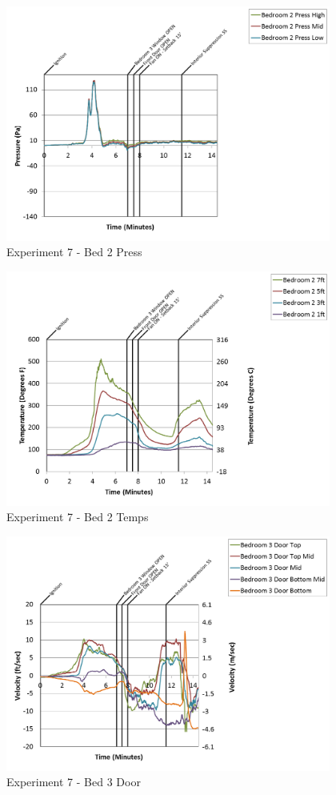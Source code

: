\documentclass{article}
\begin{document}
\begin{appendices}
\begin{figure}[h!]
	\centering
	\includegraphics[height=3.05in]{0_Images/Results_Charts/Exp_7_Charts/Bed2Press.png}
	\caption{Experiment 7 - Bed 2 Press}
\end{figure}

\clearpage

\begin{figure}[h!]
	\centering
	\includegraphics[height=3.05in]{0_Images/Results_Charts/Exp_7_Charts/Bed2Temps.png}
	\caption{Experiment 7 - Bed 2 Temps}
\end{figure}


\begin{figure}[h!]
	\centering
	\includegraphics[height=3.05in]{0_Images/Results_Charts/Exp_7_Charts/Bed3Door.png}
	\caption{Experiment 7 - Bed 3 Door}
\end{figure}


\end{appendices}
\end{document}
